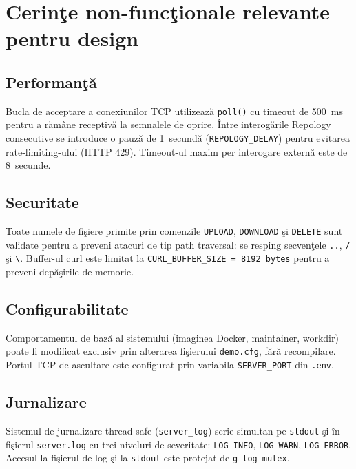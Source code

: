 \documentclass[12pt, a4paper]{article}
\begin{document}
\section{Cerin\c{t}e non-func\c{t}ionale relevante pentru design}

\subsection{Performan\c{t}\u{a}}

Bucla de acceptare a conexiunilor TCP utilizeaz\u{a} \texttt{poll()} cu timeout de 500~ms pentru a
r\u{a}m\^{a}ne receptiv\u{a} la semnalele de oprire. \^{I}ntre interog\u{a}rile Repology
consecutive se introduce o pauz\u{a} de 1~secund\u{a} (\texttt{REPOLOGY\_DELAY}) pentru evitarea
rate-limiting-ului (HTTP 429). Timeout-ul maxim per interogare extern\u{a} este de 8~secunde.

\subsection{Securitate}

Toate numele de fi\c{s}iere primite prin comenzile \texttt{UPLOAD}, \texttt{DOWNLOAD} \c{s}i
\texttt{DELETE} sunt validate pentru a preveni atacuri de tip path traversal: se resping secven\c{t}ele
\texttt{..}, \texttt{/} \c{s}i \texttt{\textbackslash}. Buffer-ul curl este limitat la
\texttt{CURL\_BUFFER\_SIZE = 8192~bytes} pentru a preveni dep\u{a}\c{s}irile de memorie.

\subsection{Configurabilitate}

Comportamentul de baz\u{a} al sistemului (imaginea Docker, maintainer, workdir) poate fi modificat
exclusiv prin alterarea fi\c{s}ierului \texttt{demo.cfg}, f\u{a}r\u{a} recompilare. Portul TCP de
ascultare este configurat prin variabila \texttt{SERVER\_PORT} din \texttt{.env}.

\subsection{Jurnalizare}

Sistemul de jurnalizare thread-safe (\texttt{server\_log}) scrie simultan pe \texttt{stdout} \c{s}i
\^{i}n fi\c{s}ierul \texttt{server.log} cu trei niveluri de severitate: \texttt{LOG\_INFO},
\texttt{LOG\_WARN}, \texttt{LOG\_ERROR}. Accesul la fi\c{s}ierul de log \c{s}i la
\texttt{stdout} este protejat de \texttt{g\_log\_mutex}.
\end{document}
